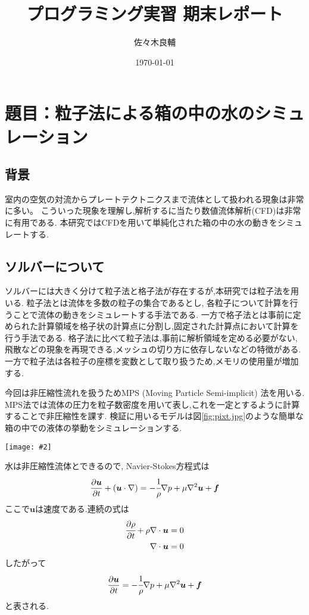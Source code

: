 \documentclass[uplatex,a4j,11pt]{jsarticle}
\makeatletter
\def\fgcaption{\def\@captype{figure}\caption}
\newcommand{\mfig}[3][width=15cm]{
\begin{center}
    \texttt{[image: \#2]}
\fgcaption{#3 \label{fig:#2}}
\end{center}
}
\makeatother
\begin{document}
\title{プログラミング実習 期末レポート}
\author{佐々木良輔}
\date{\today}
\maketitle

\section*{題目：粒子法による箱の中の水のシミュレーション}
\subsection{背景}
室内の空気の対流からプレートテクトニクスまで流体として扱われる現象は非常に多い。
こういった現象を理解し,解析するに当たり数値流体解析(CFD)は非常に有用である.
本研究ではCFDを用いて単純化された箱の中の水の動きをシミュレートする.
\subsection{ソルバーについて}
ソルバーには大きく分けて粒子法と格子法が存在するが,本研究では粒子法を用いる.
粒子法とは流体を多数の粒子の集合であるとし,
各粒子について計算を行うことで流体の動きをシミュレートする手法である.
一方で格子法とは事前に定められた計算領域を格子状の計算点に分割し,固定された計算点において計算を行う手法である.
格子法に比べて粒子法は,事前に解析領域を定める必要がない,飛散などの現象を再現できる,メッシュの切り方に依存しないなどの特徴がある.
一方で粒子法は各粒子の座標を変数として取り扱うため,メモリの使用量が増加する.

今回は非圧縮性流れを扱うためMPS (Moving Particle Semi-implicit) 法を用いる.\cite{ryuusi}\cite{ELEM13}
MPS法では流体の圧力を粒子数密度を用いて表し,これを一定とするように計算することで非圧縮性を課す.
検証に用いるモデルは図\ref{fig:pixt.jpg}のような簡単な箱の中での液体の挙動をシミュレーションする.
\mfig[width=10cm]{init.eps}{検証モデル(青点:流体粒子,灰点:ダミー粒子,黒点:壁粒子)\cite{ELEM13}}
水は非圧縮性流体とできるので, Navier-Stokes方程式は
\begin{align}
    \label{NSequ}
    \frac{\partial\bm{u}}{\partial t}+(\bm{u}\cdot\nabla)=-\cfrac{1}{\rho}\nabla p+\mu\nabla^2\bm{u}+\bm{f}
\end{align}
ここで$\bm{u}$は速度である.連続の式は
\begin{align}
    \label{cont1}
    \cfrac{\partial\rho}{\partial t}+\rho\nabla\cdot\bm{u}=0\\
    \label{cont2}
    \nabla\cdot\bm{u}=0
\end{align}
したがって
\begin{align}
    \label{NSequ2}
    \frac{\partial\bm{u}}{\partial t}=-\cfrac{1}{\rho}\nabla p+\mu\nabla^2\bm{u}+\bm{f}
\end{align}
と表される.
\end{document}
